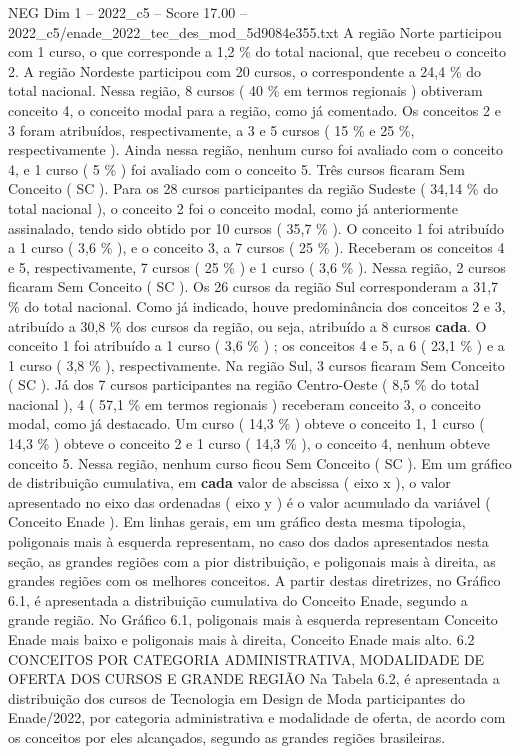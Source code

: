 \begin{textsample}{NEG Dim 1 – 2022\_c5 – Score 17.00 – 2022\_c5/enade\_2022\_tec\_des\_mod\_5d9084e355.txt}
A região Norte participou com 1 curso, o que corresponde a 1,2 \% do total nacional, que recebeu o conceito 2.
A região Nordeste participou com 20 cursos, o correspondente a 24,4 \% do total nacional.
Nessa região, 8 cursos ( 40 \% em termos regionais ) obtiveram conceito 4, o conceito modal para a região, como já comentado.
Os conceitos 2 e 3 foram atribuídos, respectivamente, a 3 e 5 cursos ( 15 \% e 25 \%, respectivamente ).
Ainda nessa região, nenhum curso foi avaliado com o conceito 4, e 1 curso ( 5 \% ) foi avaliado com o conceito 5.
Três cursos ficaram Sem Conceito ( SC ).
Para os 28 cursos participantes da região Sudeste ( 34,14 \% do total nacional ), o conceito 2 foi o conceito modal, como já anteriormente assinalado, tendo sido obtido por 10 cursos ( 35,7 \% ).
O conceito 1 foi atribuído a 1 curso ( 3,6 \% ), e o conceito 3, a 7 cursos ( 25 \% ).
Receberam os conceitos 4 e 5, respectivamente, 7 cursos ( 25 \% ) e 1 curso ( 3,6 \% ).
Nessa região, 2 cursos ficaram Sem Conceito ( SC ).
Os 26 cursos da região Sul corresponderam a 31,7 \% do total nacional.
Como já indicado, houve predominância dos conceitos 2 e 3, atribuído a 30,8 \% dos cursos da região, ou seja, atribuído a 8 cursos \textbf{cada}.
O conceito 1 foi atribuído a 1 curso ( 3,6 \% ) ; os conceitos 4 e 5, a 6 ( 23,1 \% ) e a 1 curso ( 3,8 \% ), respectivamente.
Na região Sul, 3 cursos ficaram Sem Conceito ( SC ).
Já dos 7 cursos participantes na região Centro-Oeste ( 8,5 \% do total nacional ), 4 ( 57,1 \% em termos regionais ) receberam conceito 3, o conceito modal, como já destacado.
Um curso ( 14,3 \% ) obteve o conceito 1, 1 curso ( 14,3 \% ) obteve o conceito 2 e 1 curso ( 14,3 \% ), o conceito 4, nenhum obteve conceito 5.
Nessa região, nenhum curso ficou Sem Conceito ( SC ).
Em um gráfico de distribuição cumulativa, em \textbf{cada} valor de abscissa ( eixo x ), o valor apresentado no eixo das ordenadas ( eixo y ) é o valor acumulado da variável ( Conceito Enade ).
Em linhas gerais, em um gráfico desta mesma tipologia, poligonais mais à esquerda representam, no caso dos dados apresentados nesta seção, as grandes regiões com a pior distribuição, e poligonais mais à direita, as grandes regiões com os melhores conceitos.
A partir destas diretrizes, no Gráfico 6.1, é apresentada a distribuição cumulativa do Conceito Enade, segundo a grande região.
No Gráfico 6.1, poligonais mais à esquerda representam Conceito Enade mais baixo e poligonais mais à direita, Conceito Enade mais alto. 6.2 CONCEITOS POR CATEGORIA ADMINISTRATIVA, MODALIDADE DE OFERTA DOS CURSOS E GRANDE REGIÃO Na Tabela 6.2, é apresentada a distribuição dos cursos de Tecnologia em Design de Moda participantes do Enade/2022, por categoria administrativa e modalidade de oferta, de acordo com os conceitos por eles alcançados, segundo as grandes regiões brasileiras.

\end{textsample}
